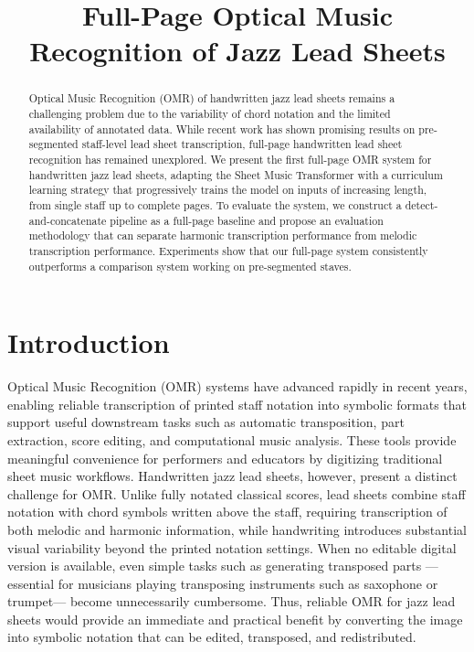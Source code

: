 \documentclass{article}
\title{Full-Page Optical Music Recognition of Jazz Lead Sheets}
\begin{document}
\maketitle

\begin{abstract}
Optical Music Recognition (OMR) of handwritten jazz lead sheets remains a challenging problem due to the variability of chord notation and the limited availability of annotated data. While recent work has shown promising results on pre-segmented staff-level lead sheet transcription, full-page handwritten lead sheet recognition has remained unexplored. We present the first full-page OMR system for handwritten jazz lead sheets, adapting the Sheet Music Transformer with a curriculum learning strategy that progressively trains the model on inputs of increasing length, from single staff up to complete pages. To evaluate the system, we construct a detect-and-concatenate pipeline as a full-page baseline and propose an evaluation methodology that can separate harmonic transcription performance from melodic transcription performance. Experiments show that our full-page system consistently outperforms a comparison system working on pre-segmented staves. %
\end{abstract}

\section{Introduction}
Optical Music Recognition (OMR) systems have advanced rapidly in recent years, enabling reliable transcription of printed staff notation into symbolic formats that support useful downstream tasks such as automatic transposition, part extraction, score editing, and computational music analysis. These tools provide meaningful convenience for performers and educators by digitizing traditional sheet music workflows\cite{calvo-zaragoza_understanding_2021}. Handwritten jazz lead sheets, however, present a distinct challenge for OMR. Unlike fully notated classical scores, lead sheets combine staff notation with chord symbols written above the staff, requiring transcription of both melodic and harmonic information, while handwriting introduces substantial visual variability beyond the printed notation settings. 
When no editable digital version is available, even simple tasks such as generating transposed parts ---essential for musicians playing transposing instruments such as saxophone or trumpet--- become unnecessarily cumbersome. %
Thus, reliable OMR for jazz lead sheets would provide an immediate and practical benefit by converting the image into symbolic notation that can be edited, transposed, and redistributed.
\end{document}
